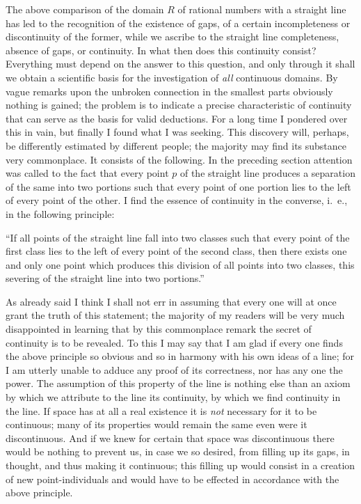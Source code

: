 \documentclass[twoside,openright]{article}
\begin{document}
The above comparison of the domain $R$ of rational numbers with a
straight line has led to the recognition of the existence of gaps, of
a certain incompleteness or discontinuity of the former, while we
ascribe to the straight line completeness, absence of gaps, or
continuity.  In what then does this continuity consist?  Everything
must depend on the answer to this question, and only through it shall
we obtain a scientific basis for the investigation of \textit{all}
continuous domains.  By vague remarks upon the unbroken connection in
the smallest parts obviously nothing is gained; the problem is to
indicate a precise characteristic of continuity that can serve as the
basis for valid deductions.  For a long time I pondered over this in
vain, but finally I found what I was seeking. This discovery will,
perhaps, be differently estimated by different people; the majority
may find its substance very commonplace.  It consists of the
following. In the preceding section attention was called to the fact
that every point $p$ of the straight line produces a separation of the
same into two portions such that every point of one portion lies to
the left of every point of the other. I find the essence of continuity
in the converse, i.~e., in the following principle:

``If all points of the straight line fall into two classes such that
every point of the first class lies to the left of every point of the
second class, then there exists one and only one point which produces
this division of all points into two classes, this severing of the
straight line into two portions.''

As already said I think I shall not err in assuming that every one
will at once grant the truth of this statement; the majority of my
readers will be very much disappointed in learning that by this
commonplace remark the secret of continuity is to be revealed.  To
this I may say that I am glad if every one finds the above principle
so obvious and so in harmony with his own ideas of a line; for I am
utterly unable to adduce any proof of its correctness, nor has any one
the power. The assumption of this property of the line is nothing else
than an axiom by which we attribute to the line its continuity, by
which we find continuity in the line. If space has at all a real
existence it is \textit{not} necessary for it to be continuous; many
of its properties would remain the same even were it
discontinuous. And if we knew for certain that space was discontinuous
there would be nothing to prevent us, in case we so desired, from
filling up its gaps, in thought, and thus making it continuous; this
filling up would consist in a creation of new point-individuals and
would have to be effected in accordance with the above principle.
\end{document}
